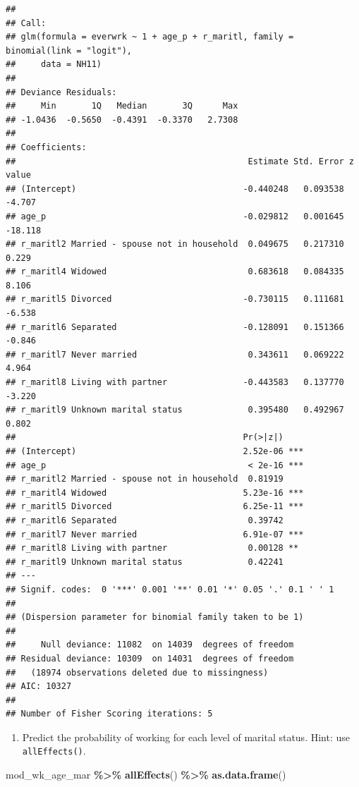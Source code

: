 \documentclass[
]{book}
\newenvironment{Shaded}{\begin{snugshade}}{\end{snugshade}}
\newcommand{\KeywordTok}[1]{\textcolor[rgb]{0.13,0.29,0.53}{\textbf{#1}}}
\newcommand{\NormalTok}[1]{#1}
\newcommand{\OperatorTok}[1]{\textcolor[rgb]{0.81,0.36,0.00}{\textbf{#1}}}
\newcommand{\StringTok}[1]{\textcolor[rgb]{0.31,0.60,0.02}{#1}}
\providecommand{\tightlist}{%
  \setlength{\itemsep}{0pt}\setlength{\parskip}{0pt}}
\begin{document}
\begin{verbatim}
## 
## Call:
## glm(formula = everwrk ~ 1 + age_p + r_maritl, family = binomial(link = "logit"), 
##     data = NH11)
## 
## Deviance Residuals: 
##     Min       1Q   Median       3Q      Max  
## -1.0436  -0.5650  -0.4391  -0.3370   2.7308  
## 
## Coefficients:
##                                              Estimate Std. Error z value
## (Intercept)                                 -0.440248   0.093538  -4.707
## age_p                                       -0.029812   0.001645 -18.118
## r_maritl2 Married - spouse not in household  0.049675   0.217310   0.229
## r_maritl4 Widowed                            0.683618   0.084335   8.106
## r_maritl5 Divorced                          -0.730115   0.111681  -6.538
## r_maritl6 Separated                         -0.128091   0.151366  -0.846
## r_maritl7 Never married                      0.343611   0.069222   4.964
## r_maritl8 Living with partner               -0.443583   0.137770  -3.220
## r_maritl9 Unknown marital status             0.395480   0.492967   0.802
##                                             Pr(>|z|)    
## (Intercept)                                 2.52e-06 ***
## age_p                                        < 2e-16 ***
## r_maritl2 Married - spouse not in household  0.81919    
## r_maritl4 Widowed                           5.23e-16 ***
## r_maritl5 Divorced                          6.25e-11 ***
## r_maritl6 Separated                          0.39742    
## r_maritl7 Never married                     6.91e-07 ***
## r_maritl8 Living with partner                0.00128 ** 
## r_maritl9 Unknown marital status             0.42241    
## ---
## Signif. codes:  0 '***' 0.001 '**' 0.01 '*' 0.05 '.' 0.1 ' ' 1
## 
## (Dispersion parameter for binomial family taken to be 1)
## 
##     Null deviance: 11082  on 14039  degrees of freedom
## Residual deviance: 10309  on 14031  degrees of freedom
##   (18974 observations deleted due to missingness)
## AIC: 10327
## 
## Number of Fisher Scoring iterations: 5
\end{verbatim}

\begin{enumerate}
\def\labelenumi{\arabic{enumi}.}
\setcounter{enumi}{1}
\tightlist
\item
  Predict the probability of working for each level of marital status. Hint: use \texttt{allEffects()}.
\end{enumerate}

\begin{Shaded}
\begin{Highlighting}[]
\NormalTok{  mod\_wk\_age\_mar }\OperatorTok{\%\textgreater{}\%}\StringTok{ }
\StringTok{      }\KeywordTok{allEffects}\NormalTok{() }\OperatorTok{\%\textgreater{}\%}
\StringTok{      }\KeywordTok{as.data.frame}\NormalTok{()}
\end{Highlighting}
\end{Shaded}
\end{document}
